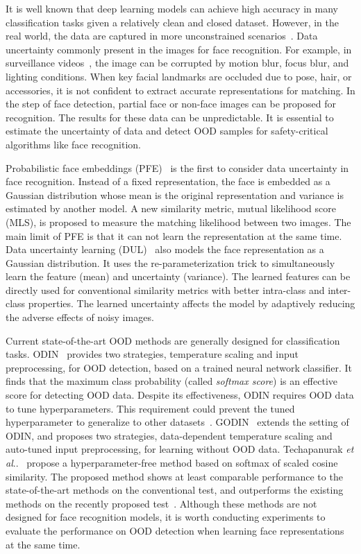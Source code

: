 \documentclass[letterpaper]{article} %
\makeatletter
\DeclareRobustCommand\onedot{\futurelet\@let@token\@onedot}
\def\@onedot{\ifx\@let@token.\else.\null\fi\xspace}
\def\etal{\emph{et al}\onedot}
\makeatother
\begin{document}
It is well known that deep learning models can achieve high accuracy in many classification tasks given a relatively clean and closed dataset.
However, in the real world, the data are captured in more unconstrained scenarios~\cite{shi2016deep,wang2020suppressing}. Data uncertainty commonly present in the images for face recognition. For example, in surveillance videos~\cite{kalka2018ijb,maze2018iarpa,klare2015pushing}, the image can be corrupted by motion blur, focus blur, and lighting conditions. When key facial landmarks are occluded due to pose, hair, or accessories, it is not confident to extract accurate representations for matching. In the step of face detection, partial face or non-face images can be proposed for recognition. The results for these data can be unpredictable.
It is essential to estimate the uncertainty of data and detect OOD samples for safety-critical algorithms like face recognition.

Probabilistic face embeddings (PFE)~\cite{shi2019probabilistic} is the first to consider data uncertainty in face recognition. Instead of a fixed representation, the face is embedded as a Gaussian distribution whose mean is the original representation and variance is estimated by another model. A new similarity metric, mutual likelihood score (MLS), is proposed to measure the matching likelihood between two images.
The main limit of PFE is that it can not learn the representation at the same time.
Data uncertainty learning (DUL)~\cite{chang2020data} also models the face representation as a Gaussian distribution. It uses the re-parameterization trick to simultaneously learn the feature (mean) and uncertainty (variance). The learned features can be directly used for conventional similarity metrics with better intra-class and inter-class properties. The learned uncertainty affects the model by adaptively reducing the adverse effects of noisy images.

Current state-of-the-art OOD methods are generally designed for classification tasks. ODIN~\cite{liang2018enhancing} provides two strategies, temperature scaling and input preprocessing, for OOD detection, based on a trained neural network classifier. It finds that the maximum class probability (called \emph{softmax score}) is an effective score for detecting OOD data. Despite its effectiveness, ODIN requires OOD data to tune hyperparameters. This requirement could prevent the tuned hyperparameter to generalize to other datasets~\cite{shafaei2019less}.
GODIN~\cite{hsu2020generalized} extends the setting of ODIN, and proposes two strategies, data-dependent temperature scaling and auto-tuned input preprocessing, for learning without OOD data.
Techapanurak \etal~\cite{techapanurak2019hyperparameter} propose a hyperparameter-free method based on softmax of scaled cosine similarity. The proposed method shows at least comparable performance to the state-of-the-art methods on the conventional test, and outperforms the existing methods on the recently proposed test~\cite{shafaei2019less}.
Although these methods are not designed for face recognition models, it is worth conducting experiments to evaluate the performance on OOD detection when learning face representations at the same time.
\end{document}
